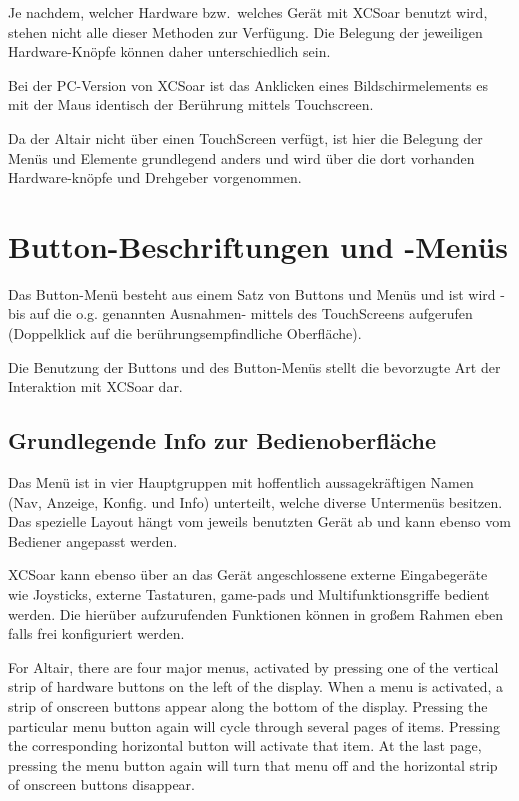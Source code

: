 Je nachdem, welcher Hardware bzw.\ welches Gerät mit \textsf{XCSoar}  benutzt wird, stehen nicht alle dieser Methoden zur Verfügung. Die Belegung der jeweiligen Hardware-Knöpfe können daher unterschiedlich sein.

Bei der \textsf{PC}-Version von \textsf{XCSoar} ist das Anklicken eines Bildschirmelements es mit der Maus identisch der Berührung mittels Touchscreen.

Da der \textsf{Altair} nicht über einen TouchScreen verfügt, ist hier die Belegung der Menüs und Elemente grundlegend anders und wird über die dort vorhanden Hardware-knöpfe und Drehgeber vorgenommen.


\section{Button-Beschriftungen und -Menüs}
Das Button-Menü besteht aus einem Satz von Buttons und Menüs und ist wird -bis auf die o.g. genannten Ausnahmen- mittels des TouchScreens aufgerufen (Doppelklick auf die berührungsempfindliche Oberfläche).

Die Benutzung der Buttons und des Button-Menüs  stellt die bevorzugte Art der Interaktion mit \textsf{XCSoar} dar.


\subsection*{Grundlegende Info zur Bedienoberfläche}
Das Menü ist in vier Hauptgruppen mit hoffentlich aussagekräftigen Namen (Nav, Anzeige, Konfig. und Info) unterteilt, welche diverse Untermenüs besitzen. Das spezielle Layout hängt vom jeweils benutzten Gerät ab und kann ebenso vom Bediener angepasst werden.

 \textsf{XCSoar} kann ebenso über an das Gerät angeschlossene externe Eingabegeräte wie Joysticks, externe Tastaturen, game-pads und Multifunktionsgriffe bedient werden. Die hierüber aufzurufenden Funktionen können in großem Rahmen eben falls frei konfiguriert  werden.

For \textsf{Altair}, there are four major menus, activated by pressing one of
the vertical strip of hardware buttons on the left of the display.
When a menu is activated, a strip of onscreen buttons appear along the
bottom of the display. Pressing the particular menu button again will
cycle through several pages of items. Pressing the corresponding
horizontal button will activate that item. At the last page, pressing
the menu button again will turn that menu off and the horizontal strip
of onscreen buttons disappear.

